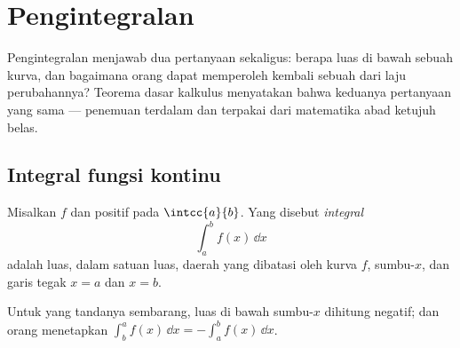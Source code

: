 \chapter{Pengintegralan}\label{ch:g12:integ}

Pengintegralan menjawab dua pertanyaan sekaligus: berapa luas di bawah sebuah
kurva, dan bagaimana orang dapat memperoleh kembali sebuah  dari laju
perubahannya? Teorema dasar kalkulus menyatakan bahwa keduanya pertanyaan yang
sama --- penemuan terdalam dan terpakai dari matematika abad ketujuh belas.

\section{Integral fungsi kontinu}

\begin{definition}\label{def:g12:integ:area}
Misalkan $f$  dan positif pada $\intcc{a}{b}$. Yang disebut
\emph{integral}
\[
\int_a^b f(x)\,\dd x
\]
adalah luas, dalam satuan luas, daerah yang dibatasi oleh kurva $f$,
sumbu-$x$, dan garis tegak $x = a$ dan $x = b$.
\end{definition}

\begin{omfigure}
\end{omfigure}

Untuk  yang tandanya sembarang, luas di bawah sumbu-$x$ dihitung
negatif; dan orang menetapkan
$\int_b^a f(x)\,\dd x = -\int_a^b f(x)\,\dd x$.

